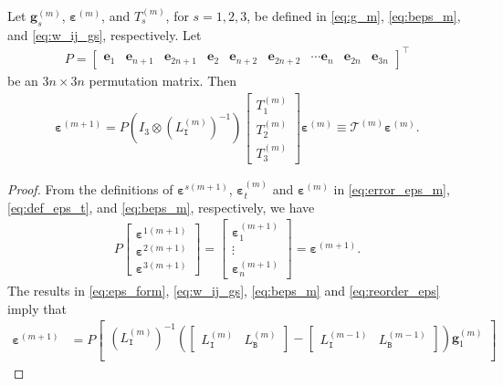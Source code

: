 \documentclass[onefignum,onetabnum]{siamonline220329}
\numberwithin{equation}{section}
\def\I{\mathtt{I}}
\def\B{\mathtt{B}}
\def\beps{{\boldsymbol{\varepsilon}}}
\begin{document}
\begin{sloppypar}
\begin{theorem}
Let $\mathbf{g}^{(m)}_s$, $\beps^{(m)}$, and $T_s^{(m)}$, for $s = 1, 2, 3$, be defined in \eqref{eq:g_m}, \eqref{eq:beps_m}, and \eqref{eq:w_ij_gs}, respectively. 
Let
\begin{align*}
P = \begin{bmatrix}
\mathbf{e}_1 & \mathbf{e}_{n+1} & \mathbf{e}_{2n+1} & \mathbf{e}_{2} & \mathbf{e}_{n+2} & \mathbf{e}_{2n+2} & \cdots \mathbf{e}_{n} & \mathbf{e}_{2n} & \mathbf{e}_{3n}
\end{bmatrix}^{\top}
\end{align*}
be an $3n \times 3n$ permutation matrix.
Then
\begin{align}
\beps^{(m+1)}  = P \left( I_3 \otimes (L_{\I}^{(m)})^{-1} \right) \begin{bmatrix}
T_1^{(m)} \\ T_2^{(m)} \\ T_3^{(m)}
\end{bmatrix} \beps^{(m)} \equiv \mathcal{T}^{(m)} \beps^{(m)}. \label{eq:iter_eps}
\end{align}
\end{theorem}
\begin{proof}
From the definitions of $\beps^{s(m+1)}$, $\beps^{(m)}_t$ and $\beps^{(m)}$ in \eqref{eq:error_eps_m}, \eqref{eq:def_eps_t}, and \eqref{eq:beps_m}, respectively, we have
\begin{align}
P \begin{bmatrix}
\beps^{1(m+1)} \\ \beps^{2(m+1)} \\ \beps^{3(m+1)}
\end{bmatrix} = \begin{bmatrix}
\beps^{(m+1)}_1 \\ \vdots \\ \beps^{(m+1)}_n
\end{bmatrix} = \beps^{(m+1)}. \label{eq:reorder_eps}
\end{align}
The results in \eqref{eq:eps_form}, \eqref{eq:w_ij_gs}, \eqref{eq:beps_m} and \eqref{eq:reorder_eps} imply that
\begin{align}
\beps^{(m+1)} &= P \begin{bmatrix}
\left( L_{\I}^{(m)} \right)^{-1} \left( \begin{bmatrix} 
L_{\I}^{(m)} & L_{\B}^{(m)} 
\end{bmatrix} - \begin{bmatrix} 
L_{\I}^{(m-1)} & L_{\B}^{(m-1)} 
\end{bmatrix} \right) \mathbf{g}^{(m)}_1 \\

\end{bmatrix}
\end{align}
\end{proof}
\end{sloppypar}
\end{document}

